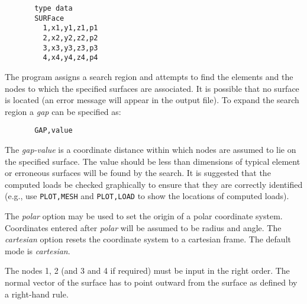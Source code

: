 \begin{verbatim}
       type data
       SURFace
         1,x1,y1,z1,p1
         2,x2,y2,z2,p2
         3,x3,y3,z3,p3
         4,x4,y4,z4,p4
\end{verbatim}

The program assigns a search region and attempts to
find the elements and the nodes to which the specified
surfaces are associated.  It is possible that no surface
is located (an error message will appear in the output file).  To
expand the search region a {\it gap} can be specified as:

\begin{verbatim}
       GAP,value
\end{verbatim}

The {\it gap-value} is a coordinate distance within which
nodes are assumed to lie on the specified surface.  The
value should be less than dimensions of typical element
or erroneous surfaces will be found by the
search.  It is suggested that the computed loads be
checked graphically to ensure that they are correctly
identified (e.g., use {\tt PLOT,MESH} and {\tt PLOT,LOAD} to show
the locations of computed loads).

The {\it polar} option may be used to set the origin of a
polar coordinate system.  Coordinates entered after
{\it polar} will be assumed to be radius and angle.  The
{\it cartesian} option resets the coordinate system to a
cartesian frame.  The default mode is {\it cartesian}.

The nodes 1, 2 (and 3 and 4 if required) must be input in the right order. The
normal vector of the surface has to point outward from the surface as defined
by a right-hand rule.
\vfil\eject
